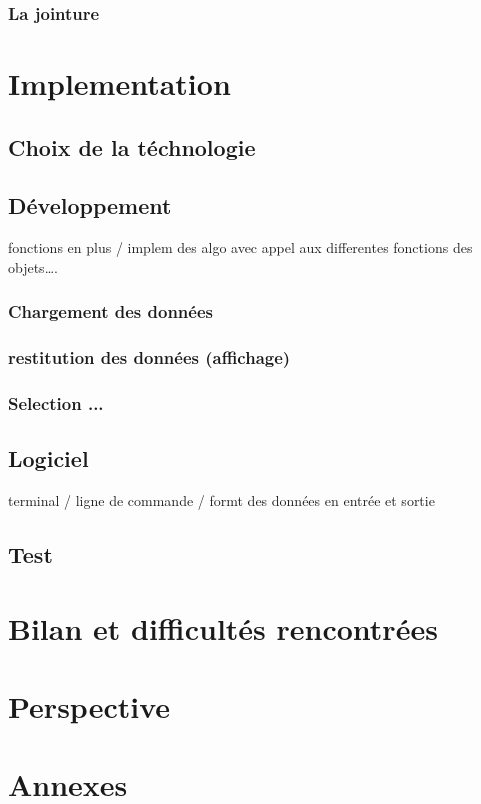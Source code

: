 \documentclass[oneside,13pt,a4paper]{report}
\begin{document}
            \subsection{La jointure}


    \chapter{Implementation}

        \section{Choix de la téchnologie}

        \section{Développement}

            fonctions en plus / implem des algo avec appel aux differentes fonctions des objets….

            \subsection{Chargement des données}

            \subsection{restitution des données (affichage)}

            \subsection{Selection ...}

        \section{Logiciel}

            terminal / ligne de commande / formt des données en entrée et sortie

        \section{Test}



    \chapter{Bilan et difficultés rencontrées}


    \chapter{Perspective}


    \chapter{Annexes}
\end{document}

